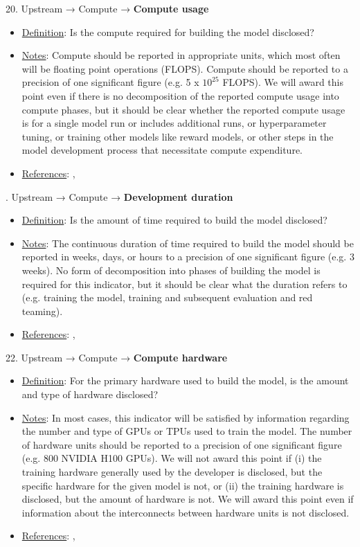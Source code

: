 20. Upstream → Compute → \textbf{Compute usage}
\vspace{-\parskip}
\begin{itemize}
	\item
	\underline{Definition}: Is the compute required for building the model disclosed?
	\item
	\underline{Notes}: Compute should be reported in appropriate units, which most often will be floating point operations (FLOPS). Compute should be reported to a precision of one significant figure (e.g. 5 x $10^{25}$ FLOPS). We will award this point even if there is no decomposition of the reported compute usage into compute phases, but it should be clear whether the reported compute usage is for a single model run or includes additional runs, or hyperparameter tuning, or training other models like reward models, or other steps in the model development process that necessitate compute expenditure.
	\item
	\underline{References}: \citet{henderson2020towards}, \citet{strubell2019energy}
\end{itemize}


. Upstream → Compute → \textbf{Development duration}
\vspace{-\parskip}
\begin{itemize}
	\item
	\underline{Definition}: Is the amount of time required to build the model disclosed?
	\item
	\underline{Notes}: The continuous duration of time required to build the model should be reported in weeks, days, or hours to a precision of one significant figure (e.g. 3 weeks). No form of decomposition into phases of building the model is required for this indicator, but it should be clear what the duration refers to (e.g. training the model, training and subsequent evaluation and red teaming).
	\item
	\underline{References}: \citet{sevilla2022compute}, \citet{hoffmann2022training}
\end{itemize}


22. Upstream → Compute → \textbf{Compute hardware}
\vspace{-\parskip}
\begin{itemize}
	\item
	\underline{Definition}: For the primary hardware used to build the model, is the amount and type of hardware disclosed?
	\item
	\underline{Notes}: In most cases, this indicator will be satisfied by information regarding the number and type of GPUs or TPUs used to train the model. The number of hardware units should be reported to a precision of one significant figure (e.g. 800 NVIDIA H100 GPUs). We will not award this point if (i) the training hardware generally used by the developer is disclosed, but the specific hardware for the given model is not, or (ii) the training hardware is disclosed, but the amount of hardware is not. We will award this point even if information about the interconnects between hardware units is not disclosed.
	\item
	\underline{References}: \citet{sevilla2022compute}, \citet{hoffmann2022training}
\end{itemize}


